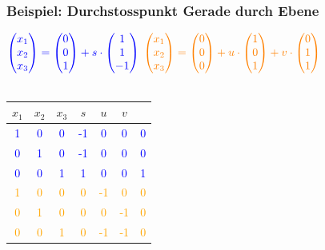 		
		\subsubsection{Beispiel: Durchstosspunkt Gerade durch Ebene}
		    
		 $\textcolor{blue}{\begin{pmatrix} x_1 \\ x_2 \\ x_3 \end{pmatrix} = \begin{pmatrix} 0 \\ 0 \\ 1 \end{pmatrix} + s \cdot \begin{pmatrix} 1 \\ 1 \\ -1\end{pmatrix}}$ \quad $\textcolor{orange}{\begin{pmatrix} x_1 \\ x_2 \\ x_3 \end{pmatrix} = \begin{pmatrix} 0 \\ 0 \\ 0 \end{pmatrix} + u \cdot \begin{pmatrix} 1 \\ 0 \\ 1\end{pmatrix} + v \cdot \begin{pmatrix} 0 \\ 1 \\ 1\end{pmatrix}}$ \\
		\\

  		\begin{tabular}{| c c c c c c | c |}
		\hline
		$x_1$ & $x_2$ & $x_3$ & $s$ & $u$ & $v$ & \\
		\hline
		\textcolor{blue}1 & \textcolor{blue}0 & \textcolor{blue}0 & \textcolor{blue}{-1} & \textcolor{blue}0 & \textcolor{blue}0 &  \textcolor{blue}0 \\
		\textcolor{blue}0 & \textcolor{blue}1 & \textcolor{blue}0 & \textcolor{blue}{-1} & \textcolor{blue}0 & \textcolor{blue}0 &  \textcolor{blue}0 \\
		\textcolor{blue}0 & \textcolor{blue}0 & \textcolor{blue}1 & \textcolor{blue}1 & \textcolor{blue}0 & \textcolor{blue}0 &  \textcolor{blue}1 \\
		\textcolor{orange}1 & \textcolor{orange}0 & \textcolor{orange}0 & \textcolor{orange}0 & \textcolor{orange}{-1} & \textcolor{orange}0 & \textcolor{orange}0 \\
		\textcolor{orange}0 & \textcolor{orange}1 & \textcolor{orange}0 & \textcolor{orange}0 & \textcolor{orange}0 & \textcolor{orange}{-1} & \textcolor{orange}0 \\
		\textcolor{orange}0 & \textcolor{orange}0 & \textcolor{orange}1 & \textcolor{orange}0 & \textcolor{orange}{-1} & \textcolor{orange}{-1} & \textcolor{orange}0 \\
	    \hline
		\end{tabular}		


